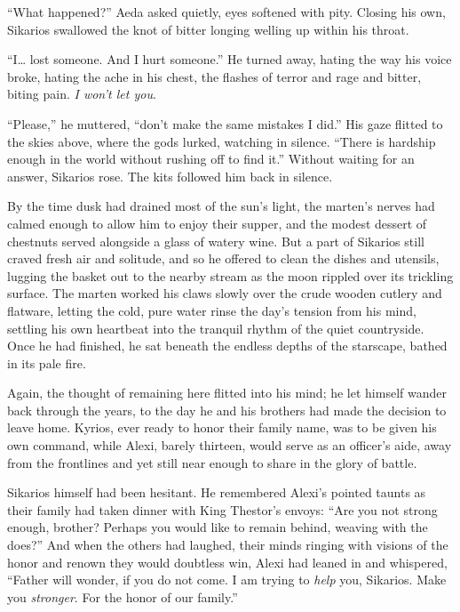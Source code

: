 ``What happened?'' Aeda asked quietly, eyes softened with pity. Closing his own, Sikarios swallowed the knot of bitter longing welling up within his throat.

``I\ldots{} lost someone. And I hurt someone.'' He turned away, hating the way his voice broke, hating the ache in his chest, the flashes of terror and rage and bitter, biting pain. \emph{I won't let you}.

``Please,'' he muttered, ``don't make the same mistakes I did.'' His gaze flitted to the skies above, where the gods lurked, watching in silence. ``There is hardship enough in the world without rushing off to find it.'' Without waiting for an answer, Sikarios rose. The kits followed him back in silence.

\secdiv

\noindent By the time dusk had drained most of the sun's light, the marten's nerves had calmed enough to allow him to enjoy their supper, and the modest dessert of chestnuts served alongside a glass of watery wine. But a part of Sikarios still craved fresh air and solitude, and so he offered to clean the dishes and utensils, lugging the basket out to the nearby stream as the moon rippled over its trickling surface. The marten worked his claws slowly over the crude wooden cutlery and flatware, letting the cold, pure water rinse the day's tension from his mind, settling his own heartbeat into the tranquil rhythm of the quiet countryside. Once he had finished, he sat beneath the endless depths of the starscape, bathed in its pale fire.

Again, the thought of remaining here flitted into his mind; he let himself wander back through the years, to the day he and his brothers had made the decision to leave home. Kyrios, ever ready to honor their family name, was to be given his own command, while Alexi, barely thirteen, would serve as an officer's aide, away from the frontlines and yet still near enough to share in the glory of battle.

Sikarios himself had been hesitant. He remembered Alexi's pointed taunts as their family had taken dinner with King Thestor's envoys: ``Are you not strong enough, brother? Perhaps you would like to remain behind, weaving with the does?'' And when the others had laughed, their minds ringing with visions of the honor and renown they would doubtless win, Alexi had leaned in and whispered, ``Father will wonder, if you do not come. I am trying to \emph{help} you, Sikarios. Make you \emph{stronger}. For the honor of our family.''

